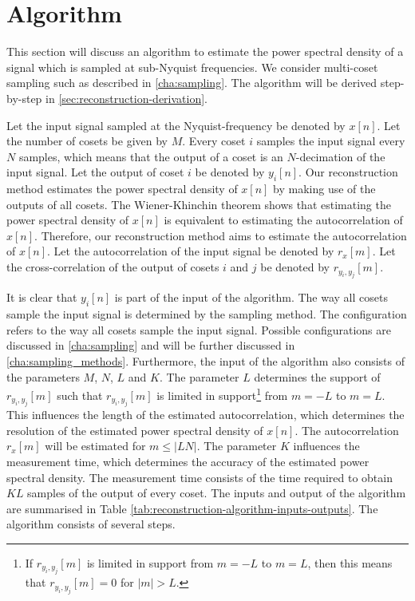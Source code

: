 \documentclass[a4paper, openany, oneside]{memoir}
\begin{document}
\section{Algorithm}
\label{sec:reconstruction-algorithm}
This section will discuss an algorithm to estimate the power spectral density of a signal which is sampled at sub-Nyquist frequencies. We consider multi-coset sampling such as described in \cref{cha:sampling}. The algorithm will be derived step-by-step in \cref{sec:reconstruction-derivation}.

Let the input signal sampled at the Nyquist-frequency be denoted by $x[n]$. Let the number of cosets be given by $M$. Every coset $i$ samples the input signal every $N$ samples, which means that the output of a coset is an $N$-decimation of the input signal. Let the output of coset $i$ be denoted by $y_i[n]$. Our reconstruction method estimates the power spectral density of $x[n]$ by making use of the outputs of all cosets. The Wiener-Khinchin theorem shows that estimating the power spectral density of $x[n]$ is equivalent to estimating the autocorrelation of $x[n]$. Therefore, our reconstruction method aims to estimate the autocorrelation of $x[n]$. Let the autocorrelation of the input signal be denoted by $r_x[m]$. Let the cross-correlation of the output of cosets $i$ and $j$ be denoted by $r_{y_i,y_j}[m]$. 

It is clear that $y_i[n]$ is part of the input of the algorithm. The way all cosets sample the input signal is determined by the sampling method. The configuration refers to the way all cosets sample the input signal. Possible configurations are discussed in \ref{cha:sampling} and will be further discussed in \ref{cha:sampling_methods}. Furthermore, the input of the algorithm also consists of the parameters $M$, $N$, $L$ and $K$. The parameter $L$ determines the support of $r_{y_i,y_j}[m]$ such that $r_{y_i,y_j}[m]$ is limited in support\footnote{If $r_{y_i,y_j}[m]$ is limited in support from $m=-L$ to $m=L$, then this means that $r_{y_i,y_j}[m]=0$ for $|m|>L$.} from $m=-L$ to $m=L$. This influences the length of the estimated autocorrelation, which determines the resolution of the estimated power spectral density of $x[n]$. The autocorrelation $r_x[m]$ will be estimated for $m \le |LN|$. The parameter $K$ influences the measurement time, which determines the accuracy of the estimated power spectral density. The measurement time consists of the time required to obtain $KL$ samples of the output of every coset. The inputs and output of the algorithm are summarised in Table \ref{tab:reconstruction-algorithm-inputs-outputs}. The algorithm consists of several steps.
\end{document}

